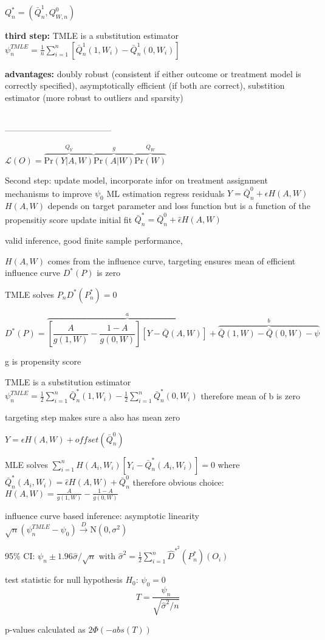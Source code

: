\documentclass[8pt]{extarticle}
\begin{document}
\begin{multicols}{2}
$Q^*_n = (\bar{Q}^1_n, Q^0_{W,n})$

\noindent \textbf{third step:} TMLE is a substitution estimator $\psi_n^{TMLE} = \frac{1}{n}\sum_{i=1}^n \left[\bar{Q}^1_n(1,W_i) -  \bar{Q}^1_n(0,W_i)\right] $



\noindent \textbf{advantages:} doubly robust (consistent if either outcome or treatment model is correctly specified), asymptotically efficient (if both are correct), substition estimator (more robust to outliers and sparsity)




\ \\
\noindent --------------------------------------

$\mathcal{L}(O) = \overbrace{\mathrm{Pr}(Y|A, W)}^{Q_Y}\overbrace{\mathrm{Pr}(A|W)}^{g}\overbrace{\mathrm{Pr}(W)}^{Q_W}$



Second step: update model, incorporate infor on treatment assignment mechanisms to improve $\psi_0$
ML estimation regress residuals $Y = \bar{Q}^0_n + \epsilon H(A,W)$
$H(A,W)$ depends on target parameter and loss function but is a function of the propensitiy score
update initial fit $\bar{Q}^*_n = \bar{Q}^0_n + \hat{\epsilon}H(A,W)$


valid inference, good finite sample performance, 


$H(A,W)$ comes from the influence curve, targeting ensures mean of efficient influence curve $D^*(P)$  is zero

TMLE solves $P_nD^*(P^*_n)=0$


$$D^*(P) = \overbrace{\left[\frac{A}{g(1,W)} - \frac{1-A}{g(0,W)}\right] \left[Y-\bar{Q}(A,W)\right]}^{a} + \overbrace{\bar{Q}(1,W) - \bar{Q}(0,W) -\psi}^{b}   $$

g is propensity score


TMLE is a substitution estimator $\psi_n^{TMLE} = \frac{1}{2}\sum_{i=1}^n \bar{Q}^*_n(1,W_i) - \frac{1}{2}\sum_{i=1}^n \bar{Q}^*_n(0,W_i)$ therefore mean of b is zero

targeting step makes sure a also has mean zero

$Y=\epsilon H(A,W) + offset(\bar{Q}^0_n)$



MLE solves $\sum_{i=1}^n H(A_i, W_i)\left[Y_i-\bar{Q}^*_n(A_i,W_i)\right]=0$ where $\bar{Q}^*_n(A_i,W_i) = \hat{\epsilon}H(A,W) + \bar{Q}^0_n$
 therefore obvious choice: $H(A,W) = \frac{A}{g(1,W)} - \frac{1-A}{g(0,W)}$
 
 
 influence curve based inference: 
 asymptotic linearity $\sqrt{n}\left(\psi_n^{TMLE} - \psi_0\right) \overset{D}{\rightarrow} \mathrm{N}(0,\sigma^2)$
 
 95\% CI: $\psi_n \pm 1.96 \hat{\sigma}/\sqrt{n}$ with $\hat{\sigma}^2=\frac{1}{2}\sum_{i=1}^n \hat{D}^{*^2}(P^*_n)(O_i)$
 
 test statistic for null hypothesis $H_0$: $\psi_0=0$ $$T=\frac{\psi_n}{\sqrt{\hat{\sigma}^2/n}}$$
 
 p-values calculated as $2\Phi(-abs(T))$

\end{multicols}
\end{document}
